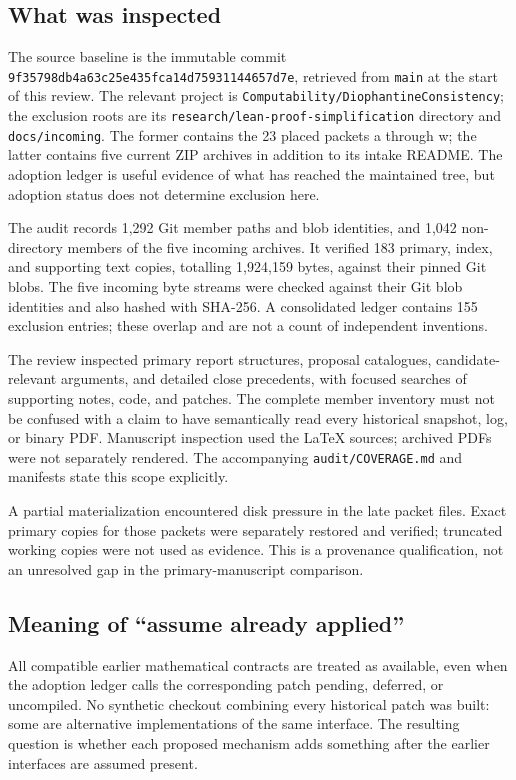 \documentclass[11pt]{article}
\newcommand{\code}[1]{\nolinkurl{#1}}
\newcommand{\commit}{\texttt{9f35798db4a63c25e435fca14d75931144657d7e}}
\begin{document}
\subsection{What was inspected}
The source baseline is the immutable commit \commit, retrieved from
\code{main} at the start of this review. The relevant project is
\code{Computability/DiophantineConsistency}; the exclusion roots are its
\code{research/lean-proof-simplification} directory and
\code{docs/incoming}. The former contains the 23 placed packets a through w;
the latter contains five current ZIP archives in addition to its intake
README. The adoption ledger is useful evidence of what has reached the maintained
tree, but adoption status does not determine exclusion here.\cite{repo,prior,incoming,adoption}

The audit records 1,292 Git member paths and blob identities, and 1,042
non-directory members of the five incoming archives. It verified 183 primary,
index, and supporting text copies, totalling 1,924,159 bytes, against their
pinned Git blobs. The five incoming byte streams were checked against their
Git blob identities and also hashed with SHA-256. A consolidated ledger contains
155 exclusion entries; these overlap and are not a count of independent
inventions.

The review inspected primary report structures, proposal catalogues,
candidate-relevant arguments, and detailed close precedents, with focused
searches of supporting notes, code, and patches. The complete member inventory
must not be confused with a claim to have semantically read every historical
snapshot, log, or binary PDF. Manuscript inspection used the LaTeX sources;
archived PDFs were not separately rendered. The accompanying
\code{audit/COVERAGE.md} and manifests state this scope explicitly.

A partial materialization encountered disk pressure in the late packet files.
Exact primary copies for those packets were separately restored and verified;
truncated working copies were not used as evidence. This is a provenance
qualification, not an unresolved gap in the primary-manuscript comparison.

\subsection{Meaning of ``assume already applied''}
All compatible earlier mathematical contracts are treated as available, even
when the adoption ledger calls the corresponding patch pending, deferred, or
uncompiled. No synthetic checkout combining every historical patch was built:
some are alternative implementations of the same interface. The resulting
question is whether each proposed mechanism adds something after the earlier
interfaces are assumed present.
\end{document}

